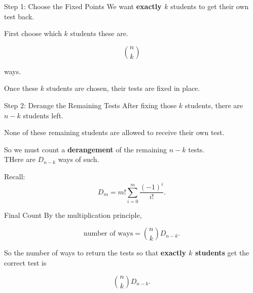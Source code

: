 \begin{frame}{Step 1: Choose the Fixed Points}
  We want \textbf{exactly \(k\)} students to get their own test back.

  \vspace{0.5em}

  First choose which \(k\) students these are.

  \[
    \binom{n}{k}
  \]

  ways.

  \vspace{0.5em}

  Once these \(k\) students are chosen, their tests are fixed in place.
\end{frame}

\begin{frame}{Step 2: Derange the Remaining Tests}
  After fixing those \(k\) students, there are \(n-k\) students left.

  \vspace{0.5em}

  None of these remaining students are allowed to receive their own test.

  \vspace{0.5em}

  So we must count a \textbf{derangement} of the remaining \(n-k\) tests.\\
  THere are $D_{n-k}$ ways of such.

  \vspace{0.5em}

  Recall:
  \[
    D_m = m!\sum_{i=0}^{m}\frac{(-1)^i}{i!}.
  \]
\end{frame}

\begin{frame}{Final Count}
  By the multiplication principle,

  \[
    \text{number of ways}
    =
    \binom{n}{k} D_{n-k}.
  \]

  \vspace{0.8em}

  So the number of ways to return the tests so that
  \textbf{exactly \(k\) students} get the correct test is

  \[
    \boxed{\binom{n}{k}D_{n-k}}.
  \]

  \vspace{0.8em}
\end{frame}

